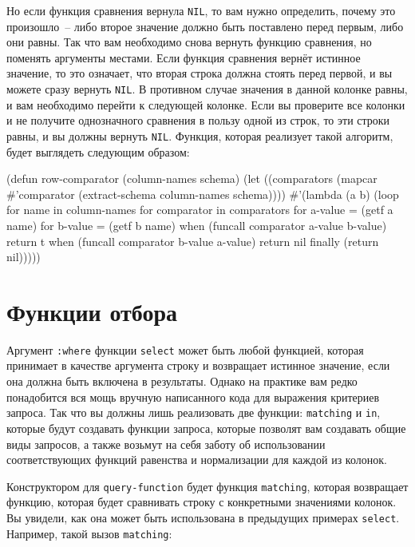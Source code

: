 Но если функция сравнения вернула \lstinline{NIL}, то вам нужно определить, почему это
произошло~-- либо второе значение должно быть поставлено перед первым, либо они равны.  Так
что вам необходимо снова вернуть функцию сравнения, но поменять аргументы местами.  Если
функция сравнения вернёт истинное значение, то это означает, что вторая строка должна
стоять перед первой, и вы можете сразу вернуть \lstinline{NIL}.  В противном случае
значения в данной колонке равны, и вам необходимо перейти к следующей колонке.  Если вы
проверите все колонки и не получите однозначного сравнения в пользу одной из строк, то эти
строки равны, и вы должны вернуть \lstinline{NIL}.  Функция, которая реализует такой
алгоритм, будет выглядеть следующим образом:

\begin{myverb}
(defun row-comparator (column-names schema)
  (let ((comparators (mapcar #'comparator (extract-schema column-names schema))))
    #'(lambda (a b)
        (loop
           for name in column-names
           for comparator in comparators
           for a-value = (getf a name)
           for b-value = (getf b name)
           when (funcall comparator a-value b-value) return t
           when (funcall comparator b-value a-value) return nil
           finally (return nil)))))
\end{myverb}

\section{Функции отбора}

Аргумент \lstinline{:where} функции \lstinline{select} может быть любой функцией, которая принимает
в качестве аргумента строку и возвращает истинное значение, если она должна быть включена
в результаты.  Однако на практике вам редко понадобится вся мощь вручную написанного кода
для выражения критериев запроса.  Так что вы должны лишь реализовать две функции:
\lstinline{matching} и \lstinline{in}, которые будут создавать функции запроса, которые позволят вам
создавать общие виды запросов, а также возьмут на себя заботу об использовании
соответствующих функций равенства и нормализации для каждой из колонок.

Конструктором для \lstinline{query-function} будет функция \lstinline{matching}, которая
возвращает функцию, которая будет сравнивать строку с конкретными значениями колонок.  Вы
увидели, как она может быть использована в предыдущих примерах \lstinline{select}.
Например, такой вызов \lstinline{matching}:

